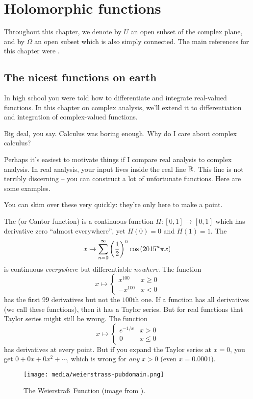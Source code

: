 \chapter{Holomorphic functions}
\label{ch:holomorphic_functions}
Throughout this chapter, we denote by $U$ an open subset of the complex plane,
and by $\Omega$ an open subset which is also simply connected.
The main references for this chapter were \cite{ref:dartmouth,ref:bak_ca}.

\section{The nicest functions on earth}
In high school you were told how to differentiate and integrate real-valued functions.
In this chapter on complex analysis,
we'll extend it to differentiation and integration of complex-valued functions.

Big deal, you say. Calculus was boring enough. Why do I care about complex calculus?

Perhaps it's easiest to motivate things if I compare real analysis to complex analysis.
In real analysis, your input lives inside the real line $\mathbb R$.
This line is not terribly discerning -- you can construct a lot of unfortunate functions.
Here are some examples.
\begin{example}
	You can skim over these very quickly: they're only here to make a point.
	\begin{enumerate}[(a)]
		\ii The  (or Cantor function)
		is a continuous function $H \colon [0,1] \to [0,1]$
		which has derivative zero ``almost everywhere'',
		yet $H(0) = 0$ and $H(1) = 1$.
		\ii The 
		\[ x \mapsto \sum_{n=0}^\infty \left( \frac{1}{2} \right)^n \cos \left( 2015^n \pi x \right) \]
		is continuous \emph{everywhere} but differentiable \emph{nowhere}.
		\ii The function
		\[
			x \mapsto
			\begin{cases}
				x^{100} & x \ge 0 \\
				-x^{100} & x < 0
			\end{cases}
		\]
		has the first $99$ derivatives but not the $100$th one.
		\ii
		If a function has all derivatives (we call these  functions),
		then it has a Taylor series.
		But for real functions that Taylor series might still be wrong. The function
		\[ x \mapsto
			\begin{cases}
				e^{-1/x} & x > 0 \\
				0 & x \le 0
			\end{cases}
		\]
		has derivatives at every point.
		But if you expand the Taylor series at $x=0$, you get $0 + 0x + 0x^2 + \cdots$,
		which is wrong for \emph{any} $x > 0$ (even $x=0.0001$).
	\end{enumerate}
\end{example}
\begin{figure}[h]
	\centering
	\texttt{[image: media/weierstrass-pubdomain.png]}
	\caption{The Weierstra\ss\ Function (image from \cite{img:weierstrass}).}
\end{figure}


